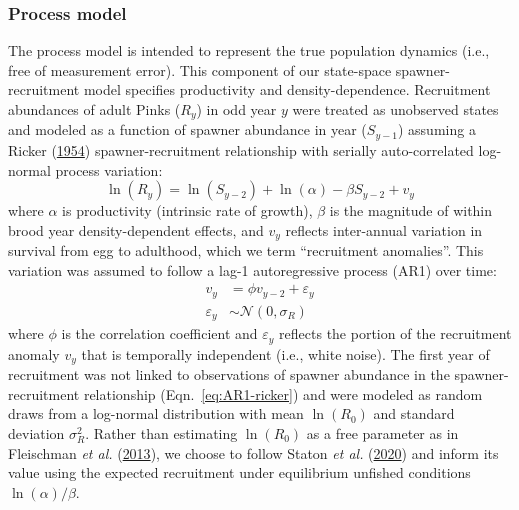 \documentclass[french,11pt]{book}
\begin{document}
\hypertarget{process-model}{%
\subsubsection{Process model}\label{process-model}}

The process model is intended to represent the true population dynamics (i.e., free of measurement error). This component of our state-space spawner-recruitment model specifies productivity and density-dependence. Recruitment abundances of adult Pinks (\(R_y\)) in odd year \(y\) were treated as unobserved states and modeled as a function of spawner abundance in year (\(S_{y-1}\)) assuming a Ricker (\protect\hyperlink{ref-rickerStockRecruitment1954}{1954}) spawner-recruitment relationship with serially auto-correlated log-normal process variation:
\begin{equation}
\ln(R_y) = \ln(S_{y-2}) + \ln(\alpha) - \beta S_{y-2} + v_y
\label{eq:AR1-ricker}
\end{equation}
where \(\alpha\) is productivity (intrinsic rate of growth), \(\beta\) is the magnitude of within brood year density-dependent effects, and \(v_y\) reflects inter-annual variation in survival from egg to adulthood, which we term ``recruitment anomalies''. This variation was assumed to follow a lag-1 autoregressive process (AR1) over time:
\begin{equation}
\begin{aligned}
v_y &= \phi v_{y-2} + \varepsilon_y \\
\varepsilon_y &\sim \mathcal{N}(0, \sigma_R)
\end{aligned}
\label{eq:AR1}
\end{equation}
where \(\phi\) is the correlation coefficient and \(\varepsilon_y\) reflects the portion of the recruitment anomaly \(v_y\) that is temporally independent (i.e., white noise). The first year of recruitment was not linked to observations of spawner abundance in the spawner-recruitment relationship (Eqn.~\ref{eq:AR1-ricker}) and were modeled as random draws from a log-normal distribution with mean \(\ln(R_0)\) and standard deviation \(\sigma_{R}^2\). Rather than estimating \(\ln(R_0)\) as a free parameter as in Fleischman \emph{et al.} (\protect\hyperlink{ref-fleischmanAgestructuredStatespaceStock2013}{2013}), we choose to follow Staton \emph{et al.} (\protect\hyperlink{ref-statonEvaluationMethodsSpawner2020}{2020}) and inform its value using the expected recruitment under equilibrium unfished conditions \(\ln(\alpha)/\beta\).
\end{document}
